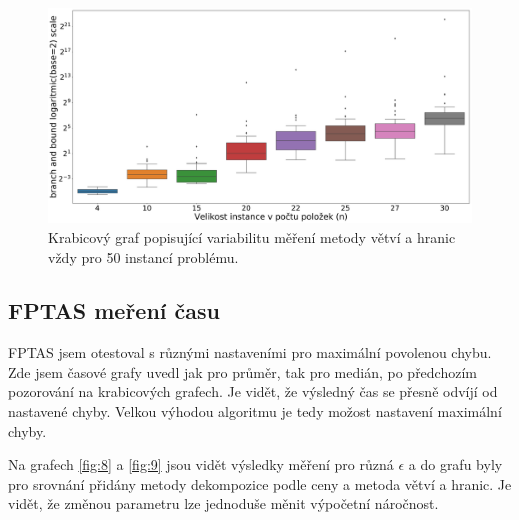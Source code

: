 \documentclass[11pt]{article}
\begin{document}
\begin{figure}[h]\centering
	\includegraphics[scale=0.2]{img/boxBB}
 	\caption[2]{Krabicový graf popisující variabilitu měření metody větví a hranic vždy pro 50 instancí problému.}\label{fig:7}
 \end{figure} 	

\subsection{FPTAS meření času}

FPTAS jsem otestoval s různými nastaveními pro maximální povolenou chybu. Zde jsem časové grafy uvedl jak pro průměr, tak pro medián, po předchozím pozorování na krabicových grafech. Je vidět, že výsledný čas se přesně odvíjí od nastavené chyby. Velkou výhodou algoritmu je tedy možost nastavení maximální chyby.

Na grafech \ref{fig:8} a \ref{fig:9} jsou vidět výsledky měření pro různá $\epsilon$ a do grafu byly pro srovnání přidány metody dekompozice podle ceny a metoda větví a hranic. Je vidět, že změnou parametru lze jednoduše měnit výpočetní náročnost.
\end{document}
